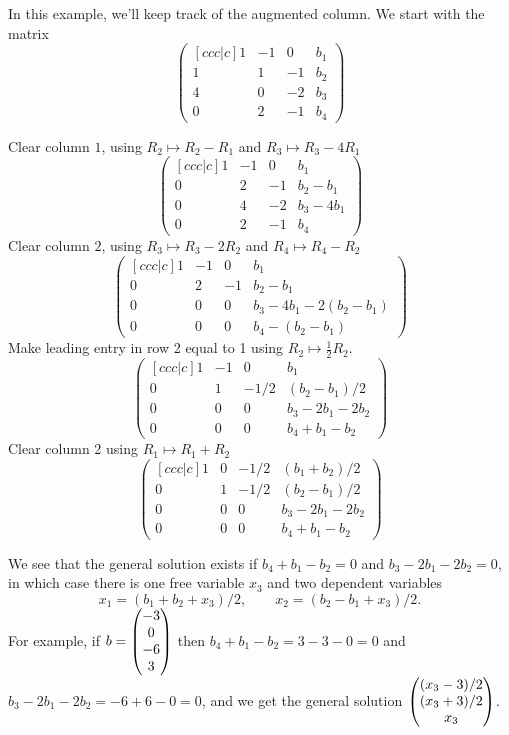 \documentclass{article}
\begin{document}
\begin{Example}
In this example, we'll keep track of the augmented column. We start
with the matrix \[\begin{pmatrix}[ccc|c] 1 & -1 & 0 & b_1 \\ 1 & 1 &
-1 & b_2 \\ 4 & 0 & -2 & b_3 \\ 0 & 2 & -1 & b_4 \end{pmatrix}\]


Clear column \(1\), using \(R_2\mapsto R_2-R_1\) and \(R_3\mapsto
R_3-4R_1\)\[\begin{pmatrix}[ccc|c] 1 & -1 & 0 & b_1\\ 0 & 2 & -1
&b_2-b_1 \\ 0 & 4 & -2 & b_3-4b_1\\ 0 & 2 & -1 &b_4 \end{pmatrix}\]
Clear column \(2\), using \(R_3\mapsto R_3-2R_2\) and \(R_4\mapsto
R_4-R_2\) \[\begin{pmatrix}[ccc|c] 1 & -1 & 0 & b_1 \\ 0 & 2 & -1 &
b_2-b_1 \\ 0 & 0 & 0 & b_3-4b_1-2(b_2-b_1) \\ 0 & 0 & 0 &
b_4-(b_2-b_1) \end{pmatrix}\] Make leading entry in row 2 equal to 1
using \(R_2\mapsto\frac{1}{2}R_2\). \[\begin{pmatrix}[ccc|c] 1 & -1
& 0 & b_1 \\ 0 & 1 & -1/2 & (b_2-b_1)/2 \\ 0 & 0 & 0 & b_3-2b_1-2b_2
\\ 0 & 0 & 0 & b_4+b_1-b_2 \end{pmatrix}\] Clear column 2 using
\(R_1\mapsto R_1+R_2\)\[\begin{pmatrix}[ccc|c] 1 & 0 & -1/2 &
(b_1+b_2)/2 \\ 0 & 1 & -1/2 & (b_2-b_1)/2 \\ 0 & 0 & 0 &
b_3-2b_1-2b_2 \\ 0 & 0 & 0 & b_4+b_1-b_2\end{pmatrix}\]


We see that the general solution exists if \(b_4+b_1-b_2=0\) and
\(b_3-2b_1-2b_2=0\), in which case there is one free variable
\(x_3\) and two dependent variables \[x_1=(b_1+b_2+x_3)/2,\qquad
x_2=(b_2-b_1+x_3)/2.\] For example, if \(b=\begin{pmatrix} -3 \\ 0 \\ -6
\\ 3\end{pmatrix}\) then \(b_4+b_1-b_2=3-3-0=0\) and
\(b_3-2b_1-2b_2=-6+6-0=0\), and we get the general solution \(\begin{pmatrix}
(x_3-3)/2 \\ (x_3+3)/2 \\ x_3\end{pmatrix}\).


\end{Example}
\end{document}
